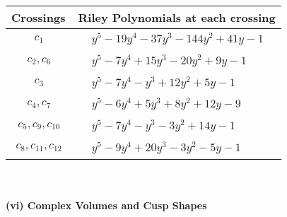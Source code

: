 \documentclass[1p]{elsarticle_modified}
\theoremstyle{definition}
\begin{document}
\begin{tabular}{m{50pt}|m{274pt}}
Crossings & \hspace{64pt}Riley Polynomials at each crossing \\
\hline $$\begin{aligned}c_{1}\end{aligned}$$&$\begin{aligned}
&y^5-19 y^4-37 y^3-144 y^2+41 y-1
\end{aligned}$\\
\hline $$\begin{aligned}c_{2},c_{6}\end{aligned}$$&$\begin{aligned}
&y^5-7 y^4+15 y^3-20 y^2+9 y-1
\end{aligned}$\\
\hline $$\begin{aligned}c_{3}\end{aligned}$$&$\begin{aligned}
&y^5-7 y^4- y^3+12 y^2+5 y-1
\end{aligned}$\\
\hline $$\begin{aligned}c_{4},c_{7}\end{aligned}$$&$\begin{aligned}
&y^5-6 y^4+5 y^3+8 y^2+12 y-9
\end{aligned}$\\
\hline $$\begin{aligned}c_{5},c_{9},c_{10}\end{aligned}$$&$\begin{aligned}
&y^5-7 y^4- y^3-3 y^2+14 y-1
\end{aligned}$\\
\hline $$\begin{aligned}c_{8},c_{11},c_{12}\end{aligned}$$&$\begin{aligned}
&y^5-9 y^4+20 y^3-3 y^2-5 y-1
\end{aligned}$\\
\hline
\end{tabular}\\~\\
\newpage\flushleft \textbf{(vi) Complex Volumes and Cusp Shapes}
\end{document}
